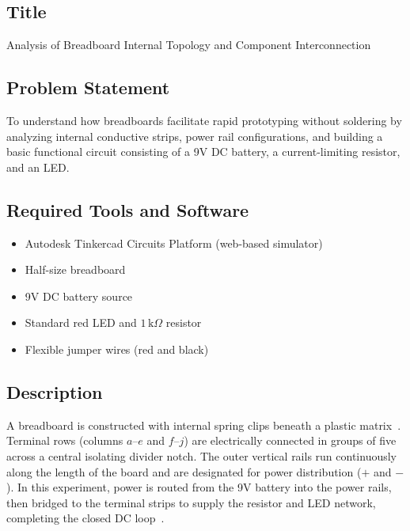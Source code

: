 \documentclass[11pt,a4paper]{article}
\begin{document}
\subsection{Title}
Analysis of Breadboard Internal Topology and Component Interconnection

\subsection{Problem Statement}
To understand how breadboards facilitate rapid prototyping without soldering by analyzing internal conductive strips, power rail configurations, and building a basic functional circuit consisting of a 9V DC battery, a current-limiting resistor, and an LED.

\subsection{Required Tools and Software}
\begin{itemize}
    \item Autodesk Tinkercad Circuits Platform (web-based simulator)~\cite{ref_tinkercad}
    \item Half-size breadboard
    \item 9V DC battery source
    \item Standard red LED and $1\,\text{k}\Omega$ resistor
    \item Flexible jumper wires (red and black)
\end{itemize}

\subsection{Description}
A breadboard is constructed with internal spring clips beneath a plastic matrix~\cite{ref_finio}. Terminal rows (columns $a\text{--}e$ and $f\text{--}j$) are electrically connected in groups of five across a central isolating divider notch. The outer vertical rails run continuously along the length of the board and are designated for power distribution ($+$ and $-$). In this experiment, power is routed from the 9V battery into the power rails, then bridged to the terminal strips to supply the resistor and LED network, completing the closed DC loop~\cite{ref_floyd}.
\end{document}
